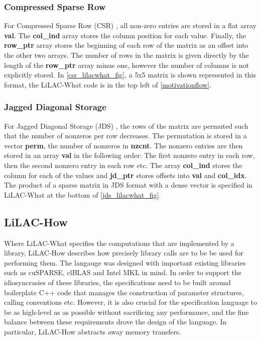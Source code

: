 \subsubsection{Compressed Sparse Row}
For Compressed Sparse Row (CSR) \cite{doi:10.1137/1.9780898718003}, all non-zero
entries are stored in a flat array \textbf{val}.
The \textbf{col\_ind} array stores the column position for each value.
Finally, the \textbf{row\_ptr} array stores the beginning of each row of the
matrix as an offset into the other two arrays.
The number of rows in the matrix is given directly by the length of the
\textbf{row\_ptr} array minus one, however the number of columns is not
explicitly stored.
In \autoref{csr_lilacwhat_fig}, a 5x5 matrix is shown represented in this
format, the LiLAC-What code is in the top left of \autoref{motivationflow}.

\subsubsection{Jagged Diagonal Storage}
For Jagged Diagonal Storage (JDS) \cite{doi:10.1137/0910073}, the rows of the
matrix are permuted such that the number of nonzeros  per row  decreases. The
permutation is stored in a vector \textbf{perm}, the number of nonzeros in
\textbf{nzcnt}.
The nonzero entries are then stored in an array \textbf{val} in the following
order: The first nonzero entry in each row, then the second nonzero entry in
each row etc.
The array \textbf{col\_ind} stores the column for each of the values and
\textbf{jd\_ptr} stores offsets into \textbf{val} and \textbf{col\_idx}.
The product of a sparse matrix in JDS format with a dense vector is specified 
in LiLAC-What at the bottom of \autoref{jds_lilacwhat_fig}.

\subsection{LiLAC-How}
\label{sec:lilachow}

    Where LiLAC-What specifies the computations that are implemented by a
    library, LiLAC-How describes how precisely library calls are to be be used
    for performing them.
    The langauge was designed with important existing libraries such as 
    cuSPARSE, clBLAS and Intel MKL in mind.
    In order to support the idiosyncrasies of these libraries, the
    specifications need to be built around boilerplate C++ code that manages the
    construction of parameter structures, calling conventions etc.
    However, it is also crucial for the specification language to be as
    high-level as as possible without sacrificing any performance, and the fine
    balance between these requirements drove the design of the language.
    In particular, LiLAC-How abstracts away memory transfers.

